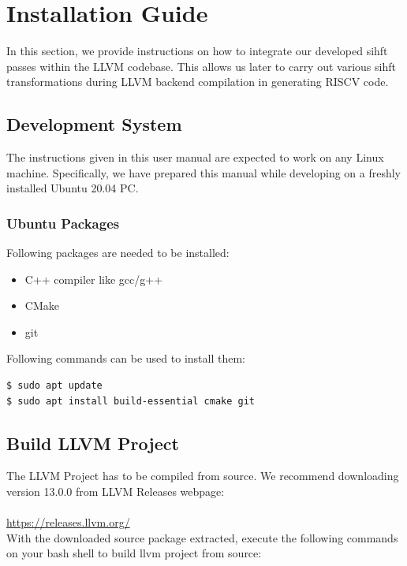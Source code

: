 

\section{Installation Guide}
\label{sec:Install}

In this section, we provide instructions on how to integrate our developed \ac{sihft} passes within the LLVM codebase.
This allows us later to carry out various \ac{sihft} transformations during LLVM backend compilation in generating
RISCV code.

\subsection{Development System}
The instructions given in this user manual are expected to work on any Linux machine. Specifically, we have prepared
this manual while developing on a freshly installed Ubuntu 20.04 PC.

\subsubsection{Ubuntu Packages}
Following packages are needed to be installed:

\begin{itemize}
 \item{C++ compiler like gcc/g++}
 \item{CMake}
 \item{git}
\end{itemize}

Following commands can be used to install them:

\begin{lstlisting}[language=bash, frame=single, basicstyle=\small\ttfamily]
$ sudo apt update
$ sudo apt install build-essential cmake git
  \end{lstlisting}

\subsection{Build LLVM Project}
\label{sec:build-llvm}
The LLVM Project has to be compiled from source. We recommend downloading version 13.0.0 from LLVM Releases webpage:
\\\\
\url{https://releases.llvm.org/} \\

With the downloaded source package extracted, execute the following commands on your bash shell to build
llvm project from source:

